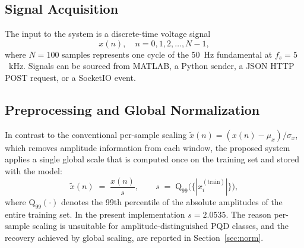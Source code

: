 \documentclass[conference]{IEEEtran}
\begin{document}
\subsection{Signal Acquisition}
The input to the system is a discrete-time voltage signal
\begin{equation}
  x(n), \quad n = 0, 1, 2, \ldots, N-1,
\end{equation}
where $N = 100$ samples represents one cycle of the 50~Hz fundamental
at $f_s = 5$~kHz. Signals can be sourced from MATLAB, a Python sender,
a JSON HTTP POST request, or a SocketIO event.

\subsection{Preprocessing and Global Normalization}\label{sec:preproc}
In contrast to the conventional per-sample scaling
$\tilde{x}(n) = (x(n) - \mu_x) / \sigma_x$, which removes amplitude
information from each window, the proposed system applies a single
global scale that is computed once on the training set and stored with
the model:
\begin{equation}
  \tilde{x}(n) \;=\; \frac{x(n)}{s}, \qquad
  s \;=\; \mathrm{Q}_{99}\Big(\big\{|x_i^{(\mathrm{train})}|\big\}\Big),
  \label{eq:globalnorm}
\end{equation}
where $\mathrm{Q}_{99}(\cdot)$ denotes the 99th percentile of the
absolute amplitudes of the entire training set. In the present
implementation $s = 2.0535$. The reason per-sample scaling is unsuitable
for amplitude-distinguished PQD classes, and the recovery achieved by
global scaling, are reported in Section~\ref{sec:norm}.
\end{document}

